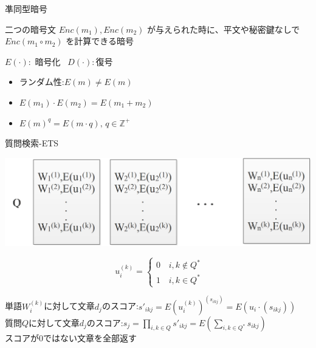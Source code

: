 \documentclass[14pt,xcolor=dvipsnames,table,dvipdfmx]{beamer}
\begin{document}
\begin{frame}{凖同型暗号}
	\begin{Definition}[凖同型暗号]
		二つの暗号文 $Enc(m_1), Enc (m_2)$ が与えられた時に、平文や秘密鍵なしで $Enc( m_1 \circ m_2 )$ を計算できる暗号
	\end{Definition}
	\begin{Example}[加算ができる凖同型暗号]
		$E(\cdot):$ 暗号化 \, $D(\cdot):$復号 \\
		\begin{itemize}
			\item ランダム性:$E(m) \neq E(m)$
			\item $ E(m_1) \cdot E (m_2) = E(m_1 + m_2) $
			\item $ E(m)^q = E(m \cdot q) , \, q \in \mathbb{Z}^+$
		\end{itemize}
	\end{Example}
\end{frame}

\begin{frame}{質問検索-ETS}
\fontsize{12pt}{7.2}\selectfont
	\begin{minipage}[c]{0.65\textwidth}
			\includegraphics[width=\columnwidth]{rk10.png}
	\end{minipage}%
	\begin{minipage}[c]{0.25\textwidth}
			$$\,\,u_i^{(k)}=\left\{
			\begin{aligned}
			0& \, i,k \notin Q^* \\
			1& \, i,k \in Q^*
			\end{aligned}
			\right.
			$$
	\end{minipage}
	\begin{block}{}
		単語$W_i^{(k)}$に対して文章$d_j$のスコア:$s'_{ikj}=E(u_i^{(k)})^{(s_{ikj})}=E(u_i \cdot (s_{ikj}))$ \\
		質問$Q$に対して文章$d_j$のスコア:$s_{j}=\prod_{i,k \in Q}s'_{ikj}=E(\sum_{i,k \in Q^*}s_{ikj})$ \\
		スコアが$0$ではない文章を全部返す
	\end{block}
\end{frame}
\end{document}
